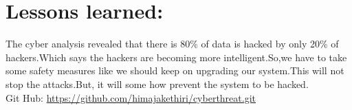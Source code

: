 \documentclass{article}
\begin{document}
\section{Lessons learned:}
The cyber analysis revealed that there is 80\% of data is hacked by only 20\% of hackers.Which says the hackers are becoming more intelligent.So,we have to take some safety measures like we should keep on upgrading our system.This will not stop the attacks.But, it will some how prevent the system to be hacked.\\


Git Hub: \url{https://github.com/himajakethiri/cyberthreat.git}
\end{document}
